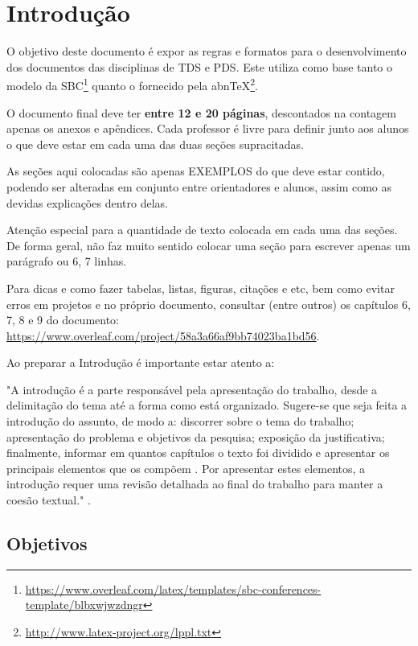 \documentclass[
	article,			%
	12pt,				%
	oneside,			%
	a4paper,			%
    BIBLATEX,           %
	english,			%
	brazil,				%
	sumario=tradicional
	]{abntex2}
\begin{document}
\section{Introdução}
O objetivo deste documento é expor as regras e formatos para o desenvolvimento dos documentos das disciplinas de TDS e PDS. Este utiliza como base tanto o modelo da SBC\footnote{\url{https://www.overleaf.com/latex/templates/sbc-conferences-template/blbxwjwzdngr}} quanto o fornecido pela abnTeX\footnote{\url{http://www.latex-project.org/lppl.txt}}.

O documento final deve ter \textbf{entre 12 e 20 páginas}, descontados na contagem apenas os anexos e apêndices. Cada professor é livre para definir junto aos alunos o que deve estar em cada uma das duas seções supracitadas.

As seções aqui colocadas são apenas EXEMPLOS do que deve estar contido, podendo ser alteradas em conjunto entre orientadores e alunos, assim como as devidas explicações dentro delas.

Atenção especial para a quantidade de texto colocada em cada uma das seções. De forma geral, não faz muito sentido colocar uma seção para escrever apenas um parágrafo ou 6, 7 linhas.

Para dicas e como fazer tabelas, listas, figuras, citações e etc, bem como evitar erros em projetos e no próprio documento, consultar (entre outros) os capítulos 6, 7, 8 e 9 do documento: \url{https://www.overleaf.com/project/58a3a66af9bb74023ba1bd56}.


Ao preparar a Introdução é importante estar atento a:
    \begin{citacao}
    "A introdução é a parte responsável pela apresentação do trabalho, desde a delimitação do tema até a forma como está organizado. Sugere-se que seja feita a introdução do assunto, de modo a: discorrer sobre o tema do trabalho; apresentação do problema e objetivos da pesquisa; exposição da justificativa; finalmente, informar em quantos capítulos o texto foi dividido e apresentar os principais elementos que os compõem . Por apresentar estes elementos, a introdução requer uma revisão detalhada ao final do trabalho para manter a coesão textual."  \cite{NormalizacaoIFSP}.
    \end{citacao}

\subsection{Objetivos}
\end{document}

